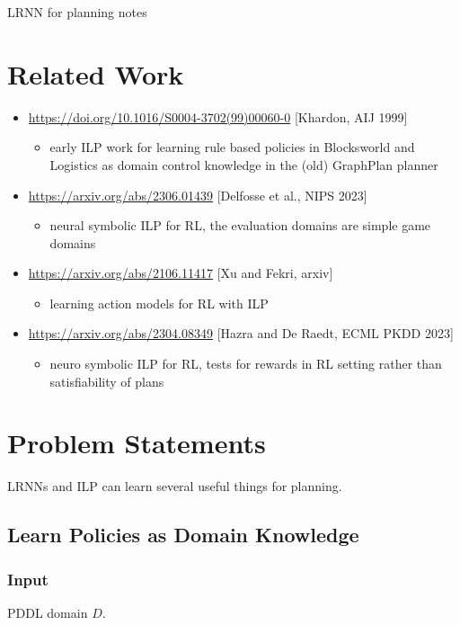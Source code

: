 \documentclass{article}
\begin{document}
\begin{center}
    \Large
    LRNN for planning notes
\end{center}

\tableofcontents
\section{Related Work}
\begin{itemize}
    \item \url{https://doi.org/10.1016/S0004-3702(99)00060-0} [Khardon, AIJ 1999]
    \begin{itemize}
        \item early ILP work for learning rule based policies in Blocksworld and Logistics as domain control knowledge in the (old) GraphPlan planner
    \end{itemize}
    \item \url{https://arxiv.org/abs/2306.01439} [Delfosse et al., NIPS 2023]
    \begin{itemize}
        \item neural symbolic ILP for RL, the evaluation domains are simple game domains
    \end{itemize}
    \item \url{https://arxiv.org/abs/2106.11417} [Xu and Fekri, arxiv]
    \begin{itemize}
        \item learning action models for RL with ILP
    \end{itemize}
    \item \url{https://arxiv.org/abs/2304.08349} [Hazra and De Raedt, ECML PKDD 2023]
    \begin{itemize}
        \item neuro symbolic ILP for RL, tests for rewards in RL setting rather than satisfiability of plans
    \end{itemize}
\end{itemize}

\section{Problem Statements}
LRNNs and ILP can learn several useful things for planning.
\subsection{Learn Policies as Domain Knowledge}
\subsubsection*{Input} PDDL domain $D$.
\end{document}
